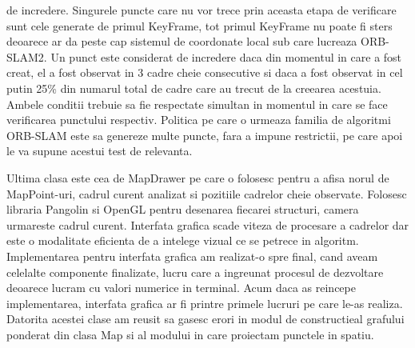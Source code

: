 \documentclass[12pt,a4paper]{report}
\begin{document}
de incredere. Singurele puncte care nu vor trece prin aceasta etapa de verificare sunt
cele generate de primul KeyFrame, tot primul KeyFrame nu poate fi sters deoarece 
ar da peste cap sistemul de coordonate local sub care lucreaza ORB-SLAM2. Un punct 
este considerat de incredere daca din momentul in care a fost creat, el a fost 
observat in 3 cadre cheie consecutive si daca a fost observat in cel putin 25\% din 
numarul total de cadre care au trecut de la creearea acestuia. Ambele conditii 
trebuie sa fie respectate simultan in momentul in care se face verificarea punctului
respectiv. Politica pe care o urmeaza familia de algoritmi ORB-SLAM este sa genereze 
multe puncte, fara a impune restrictii, pe care apoi le va supune acestui test de 
relevanta.

Ultima clasa este cea de MapDrawer pe care o folosesc pentru a afisa norul de MapPoint-uri,
cadrul curent analizat si pozitiile cadrelor cheie observate. Folosesc libraria Pangolin si 
OpenGL pentru desenarea fiecarei structuri, camera urmareste cadrul curent. Interfata grafica 
scade viteza de procesare a cadrelor dar este o modalitate eficienta de a intelege vizual ce 
se petrece in algoritm. Implementarea pentru interfata grafica am realizat-o spre final, cand 
aveam celelalte componente finalizate, lucru care a ingreunat procesul de dezvoltare deoarece 
lucram cu valori numerice in terminal. Acum daca as reincepe implementarea, interfata grafica ar fi
printre primele lucruri pe care le-as realiza. Datorita acestei clase am reusit sa gasesc erori in
modul de constructieal grafului ponderat din clasa Map si al modului in care proiectam punctele 
in spatiu. 
\end{document}
